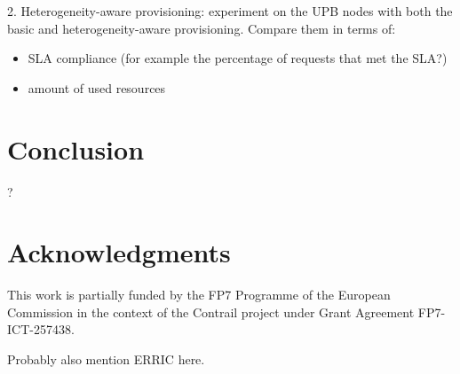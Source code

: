 \documentclass[10pt,twocolumn]{article}
\begin{document}
2. Heterogeneity-aware provisioning: experiment on the UPB nodes with both the
basic and heterogeneity-aware provisioning. Compare them in terms of:

\begin{itemize}
\item SLA compliance (for example the percentage of requests that met the SLA?)
\item amount of used resources
\end{itemize}


\section*{Conclusion}


?


\section*{Acknowledgments}

This work is partially funded by the FP7 Programme of the European
Commission in the context of the Contrail project under Grant
Agreement FP7-ICT-257438.

Probably also mention ERRIC here.




\end{document}
